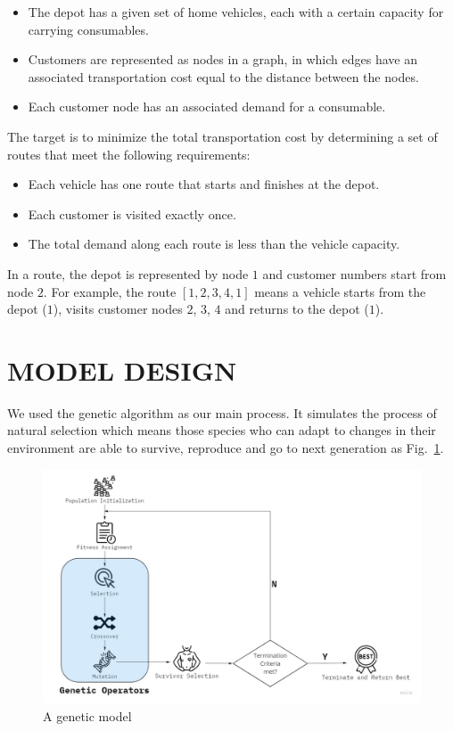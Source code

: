 \documentclass[runningheads]{llncs}
\begin{document}
\begin{itemize}
    \item
    The depot has a given set of home vehicles, each with a certain capacity for carrying consumables.

    \item
    Customers are represented as nodes in a graph, in which edges have an associated transportation cost equal to the distance between the nodes.

    \item
    Each customer node has an associated demand for a consumable.
\end{itemize}

The target is to minimize the total transportation cost by determining a set of routes that meet the following requirements:

\begin{itemize}
    \item Each vehicle has one route that starts and finishes at the depot.

    \item Each customer is visited exactly once.

    \item The total demand along each route is less than the vehicle capacity.
\end{itemize}

In a route, the depot is represented by node $1$ and customer numbers start from node $2$.
For example, the route $[1, 2, 3, 4, 1]$ means a vehicle starts from the depot ($1$), visits customer nodes $2$, $3$, $4$ and returns to the depot ($1$).


\section{MODEL DESIGN}
We used the genetic algorithm as our main process.
It simulates the process of natural selection which means those species who can adapt to changes in their environment are able to survive, reproduce and go to next generation as Fig.~\ref{fig:genetic}.

\begin{figure}[htbp]
    \centerline{\includegraphics[width=\linewidth]{figures/genetic.jpg}}
    \caption{A genetic model}
    \label{fig:genetic}
\end{figure}
\end{document}
